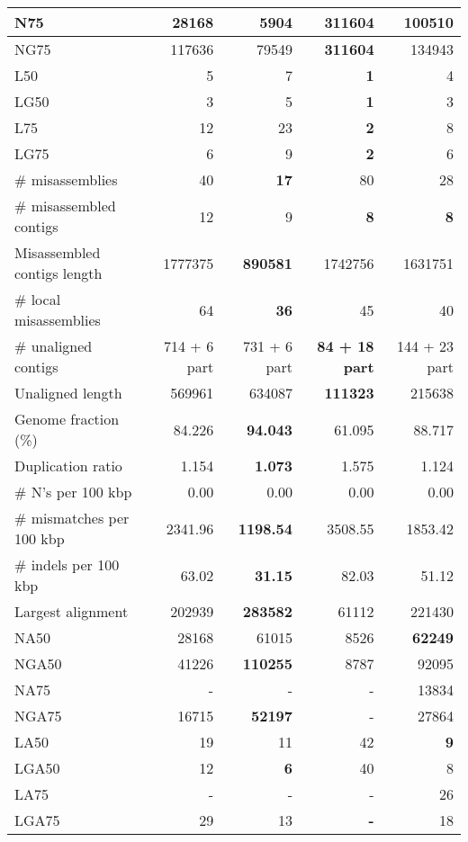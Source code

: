 \documentclass[12pt,a4paper]{article}
\begin{document}
\begin{table}[ht]
\begin{center}
\begin{tabular}{|l*{4}{|r}|}
N75 & 28168 & 5904 & {\bf 311604} & 100510 \\ \hline
NG75 & 117636 & 79549 & {\bf 311604} & 134943 \\ \hline
L50 & 5 & 7 & {\bf 1} & 4 \\ \hline
LG50 & 3 & 5 & {\bf 1} & 3 \\ \hline
L75 & 12 & 23 & {\bf 2} & 8 \\ \hline
LG75 & 6 & 9 & {\bf 2} & 6 \\ \hline
\# misassemblies & 40 & {\bf 17} & 80 & 28 \\ \hline
\# misassembled contigs & 12 & 9 & {\bf 8} & {\bf 8} \\ \hline
Misassembled contigs length & 1777375 & {\bf 890581} & 1742756 & 1631751 \\ \hline
\# local misassemblies & 64 & {\bf 36} & 45 & 40 \\ \hline
\# unaligned contigs & 714 + 6 part & 731 + 6 part & {\bf 84 + 18 part} & 144 + 23 part \\ \hline
Unaligned length & 569961 & 634087 & {\bf 111323} & 215638 \\ \hline
Genome fraction (\%) & 84.226 & {\bf 94.043} & 61.095 & 88.717 \\ \hline
Duplication ratio & 1.154 & {\bf 1.073} & 1.575 & 1.124 \\ \hline
\# N's per 100 kbp & 0.00 & 0.00 & 0.00 & 0.00 \\ \hline
\# mismatches per 100 kbp & 2341.96 & {\bf 1198.54} & 3508.55 & 1853.42 \\ \hline
\# indels per 100 kbp & 63.02 & {\bf 31.15} & 82.03 & 51.12 \\ \hline
Largest alignment & 202939 & {\bf 283582} & 61112 & 221430 \\ \hline
NA50 & 28168 & 61015 & 8526 & {\bf 62249} \\ \hline
NGA50 & 41226 & {\bf 110255} & 8787 & 92095 \\ \hline
NA75 & - & - & - & 13834 \\ \hline
NGA75 & 16715 & {\bf 52197} & - & 27864 \\ \hline
LA50 & 19 & 11 & 42 & {\bf 9} \\ \hline
LGA50 & 12 & {\bf 6} & 40 & 8 \\ \hline
LA75 & - & - & - & 26 \\ \hline
LGA75 & 29 & 13 & {\bf -} & 18 \\ \hline
\end{tabular}
\end{center}
\end{table}
\end{document}
